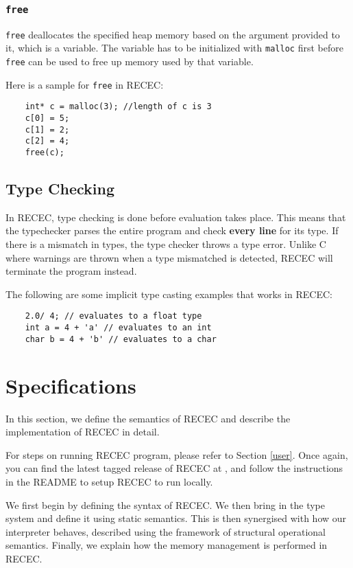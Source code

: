 \documentclass[a4paper]{article}
\begin{document}
\subsubsection{\texttt{free}}

\texttt{free} deallocates the specified heap memory based on the argument provided to it, which is a variable. The variable has to be initialized with \texttt{malloc} first before \texttt{free} can be used to free up memory used by that variable.

Here is a sample for \texttt{free} in RECEC:
\begin{verbatim}
	int* c = malloc(3); //length of c is 3
    c[0] = 5;
    c[1] = 2;
    c[2] = 4;
    free(c);
\end{verbatim}

\subsection{Type Checking}

In RECEC, type checking is done before evaluation takes place. This means that the typechecker parses the entire program and check \textbf{every line} for its type. If there is a mismatch in types, the type checker throws a type error. Unlike C where warnings are thrown when a type mismatched is detected, RECEC will terminate the program instead.

The following are some implicit type casting examples that works in RECEC:

\begin{verbatim}
	2.0/ 4; // evaluates to a float type
	int a = 4 + 'a' // evaluates to an int
	char b = 4 + 'b' // evaluates to a char
\end{verbatim}

\section{Specifications}

In this section, we define the semantics of RECEC and describe the implementation of  RECEC in detail.

For steps on running RECEC program, please refer to Section \ref{user}.
Once again, you can find the latest tagged release of RECEC at \url{}, and follow the instructions in the README to setup RECEC to run locally.

We first begin by defining the syntax of RECEC.
We then bring in the type system and define it using static semantics.
This is then synergised with how our interpreter behaves, described using the framework of structural operational semantics.
Finally, we explain how the memory management is performed in RECEC.
\end{document}

